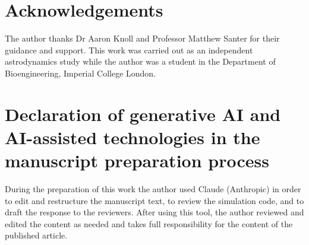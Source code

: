 \documentclass[preprint,12pt]{elsarticle}
\begin{document}
\section*{Acknowledgements}
\par\noindent The author thanks Dr Aaron Knoll and Professor Matthew Santer for their guidance and support. This work was carried out as an independent astrodynamics study while the author was a student in the Department of Bioengineering, Imperial College London.

\section*{Declaration of generative AI and AI-assisted technologies in the manuscript preparation process}
\par\noindent During the preparation of this work the author used Claude (Anthropic) in order to edit and restructure the manuscript text, to review the simulation code, and to draft the response to the reviewers. After using this tool, the author reviewed and edited the content as needed and takes full responsibility for the content of the published article.



\end{document}
